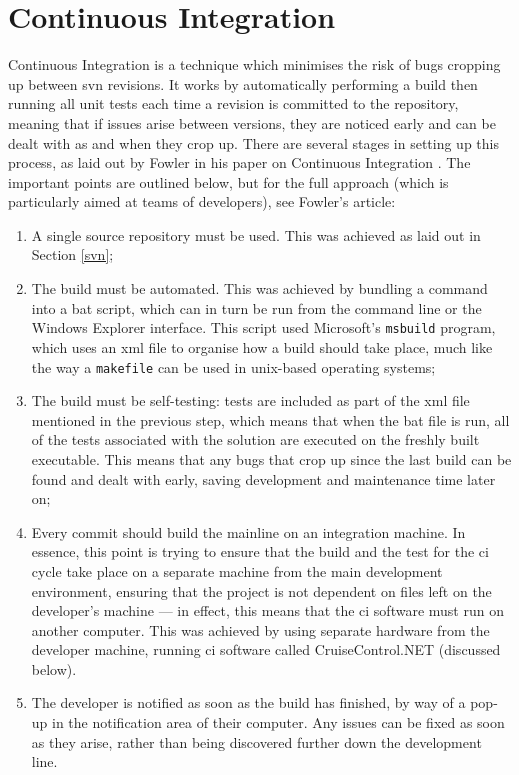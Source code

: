 \section{Continuous Integration}
\label{continuousIntegration}
Continuous Integration is a technique which minimises the risk of bugs cropping up between \gls{svn} revisions.  It works by automatically performing a build then running all unit tests each time a revision is committed to the repository, meaning that if issues arise between versions, they are noticed early and can be dealt with as and when they crop up.  There are several stages in setting up this process, as laid out by Fowler in his paper on Continuous Integration \cite{fowlerCI}.  The important points are outlined below, but for the full approach (which is particularly aimed at teams of developers), see Fowler's article:
\begin{enumerate}
	\item A single source repository must be used.  This was achieved as laid out in Section \ref{svn};
	\item The build must be automated.  This was achieved by bundling a command into a \gls{bat} script, which can in turn be run from the command line or the Windows Explorer interface.  This script used Microsoft's \texttt{msbuild} program, which uses an \gls{xml} file to organise how a build should take place, much like the way a \texttt{makefile} can be used in \gls{unix}-based operating systems;
	\item The build must be self-testing: tests are included as part of the \gls{xml} file mentioned in the previous step, which means that when the \gls{bat} file is run, all of the tests associated with the solution are executed on the freshly built executable.  This means that any bugs that crop up since the last build can be found and dealt with early, saving development and maintenance time later on;
	\item Every commit should build the mainline on an integration machine. In essence, this point is trying to ensure that the build and the test for the \gls{ci} cycle take place on a separate machine from the main development environment, ensuring that the project is not dependent on files left on the developer's machine --- in effect, this means that the \gls{ci} software must run on another computer.  This was achieved by using separate hardware from the developer machine, running \gls{ci} software called CruiseControl.NET (discussed below).  
	\item The developer is notified as soon as the build has finished, by way of a pop-up in the notification area of their computer.  Any issues can be fixed as soon as they arise, rather than being discovered further down the development line.
\end{enumerate}

